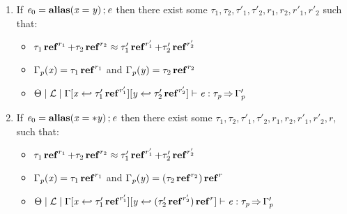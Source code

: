 \begin{lemma}[Inversion]
\begin{enumerate}
\begin{itemize}
    \end{itemize}
  \item If $\mathit{e_{{\mathrm{0}}}}  =   \mathbf{alias}( \mathit{x}  =  \mathit{y} ) \operatorname{;}  \mathit{e} $ then there exist some $\tau_{{\mathrm{1}}}, \tau_{{\mathrm{2}}}, \tau'_{{\mathrm{1}}}, \tau'_{{\mathrm{2}}}, r_{{\mathrm{1}}}, r_{{\mathrm{2}}}, r'_{{\mathrm{1}}}, r'_{{\mathrm{2}}}$ such that:
    \begin{itemize}
    \item $  \tau_{{\mathrm{1}}}  \operatorname{\mathbf{ref}}^{ r_{{\mathrm{1}}} }   +  \tau_{{\mathrm{2}}}  \operatorname{\mathbf{ref}}^{ r_{{\mathrm{2}}} }   \approx    \tau'_{{\mathrm{1}}}  \operatorname{\mathbf{ref}}^{ r'_{{\mathrm{1}}} }   +  \tau'_{{\mathrm{2}}}  \operatorname{\mathbf{ref}}^{ r'_{{\mathrm{2}}} } $
    \item $\Gamma_{\mathit{p}}  (  \mathit{x}  )  =   \tau_{{\mathrm{1}}}  \operatorname{\mathbf{ref}}^{ r_{{\mathrm{1}}} } $ and $\Gamma_{\mathit{p}}  (  \mathit{y}  )  =   \tau_{{\mathrm{2}}}  \operatorname{\mathbf{ref}}^{ r_{{\mathrm{2}}} } $
    \item $ \Theta   \mid   \mathcal{L}   \mid   \Gamma  [  \mathit{x}  \hookleftarrow   \tau'_{{\mathrm{1}}}  \operatorname{\mathbf{ref}}^{ r'_{{\mathrm{1}}} }   ]  [  \mathit{y}  \hookleftarrow   \tau'_{{\mathrm{2}}}  \operatorname{\mathbf{ref}}^{ r'_{{\mathrm{2}}} }   ]   \vdash   \mathit{e}  :  \tau_{\mathit{p}}   \operatorname{\Rightarrow}   \Gamma'_{\mathit{p}} $
    \end{itemize}
  \item If $\mathit{e_{{\mathrm{0}}}}  =   \mathbf{alias}( \mathit{x}  = *  \mathit{y} ) \operatorname{;}  \mathit{e} $ then there exist some $\tau_{{\mathrm{1}}}, \tau_{{\mathrm{2}}}, \tau'_{{\mathrm{1}}}, \tau'_{{\mathrm{2}}}, r_{{\mathrm{1}}}, r_{{\mathrm{2}}}, r'_{{\mathrm{1}}}, r'_{{\mathrm{2}}}, r$, such that:
    \begin{itemize}
    \item $  \tau_{{\mathrm{1}}}  \operatorname{\mathbf{ref}}^{ r_{{\mathrm{1}}} }   +  \tau_{{\mathrm{2}}}  \operatorname{\mathbf{ref}}^{ r_{{\mathrm{2}}} }   \approx    \tau'_{{\mathrm{1}}}  \operatorname{\mathbf{ref}}^{ r'_{{\mathrm{1}}} }   +  \tau'_{{\mathrm{2}}}  \operatorname{\mathbf{ref}}^{ r'_{{\mathrm{2}}} } $
    \item $\Gamma_{\mathit{p}}  (  \mathit{x}  )  =   \tau_{{\mathrm{1}}}  \operatorname{\mathbf{ref}}^{ r_{{\mathrm{1}}} } $ and $\Gamma_{\mathit{p}}  (  \mathit{y}  )  =   (   \tau_{{\mathrm{2}}}  \operatorname{\mathbf{ref}}^{ r_{{\mathrm{2}}} }   )  \operatorname{\mathbf{ref}}^{ r } $
    \item $ \Theta   \mid   \mathcal{L}   \mid   \Gamma  [  \mathit{x}  \hookleftarrow   \tau'_{{\mathrm{1}}}  \operatorname{\mathbf{ref}}^{ r'_{{\mathrm{1}}} }   ]  [  \mathit{y}  \hookleftarrow   (   \tau'_{{\mathrm{2}}}  \operatorname{\mathbf{ref}}^{ r'_{{\mathrm{2}}} }   )  \operatorname{\mathbf{ref}}^{ r }   ]   \vdash   \mathit{e}  :  \tau_{\mathit{p}}   \operatorname{\Rightarrow}   \Gamma'_{\mathit{p}} $

\end{itemize}
\end{enumerate}
\end{lemma}
